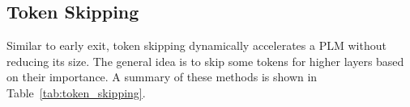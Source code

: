 \documentclass[letterpaper]{article}
\begin{document}
\begin{table}[t]
    \vspace*{0.1cm}
    \centering
    \caption{A summary of token skipping methods. This table is adapted from \citet{transkimmer}.}
    \label{tab:token_skipping}
\end{table}

\subsection{Token Skipping}
Similar to early exit, token skipping dynamically accelerates a PLM without reducing its size. The general idea is to skip some tokens for higher layers based on their importance. A summary of these methods is shown in Table~\ref{tab:token_skipping}.
\end{document}
